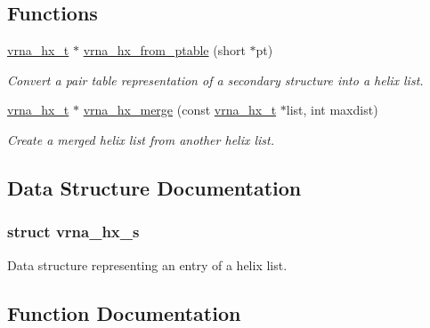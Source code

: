\subsection*{Functions}
\begin{DoxyCompactItemize}
\item 
\mbox{\hyperlink{group__struct__utils__helix__list_ga877363f3a1703b53ecd025c6fcf897a0}{vrna\+\_\+hx\+\_\+t}} $\ast$ \mbox{\hyperlink{group__struct__utils__helix__list_ga7ca60670fbbf23ae2ac9f63e5dbf8aef}{vrna\+\_\+hx\+\_\+from\+\_\+ptable}} (short $\ast$pt)
\begin{DoxyCompactList}\small\item\em Convert a pair table representation of a secondary structure into a helix list. \end{DoxyCompactList}\item 
\mbox{\label{group__struct__utils__helix__list_ga2fdaac8bb6c239c119ad5c20b145b7f2}} 
\mbox{\hyperlink{group__struct__utils__helix__list_ga877363f3a1703b53ecd025c6fcf897a0}{vrna\+\_\+hx\+\_\+t}} $\ast$ \mbox{\hyperlink{group__struct__utils__helix__list_ga2fdaac8bb6c239c119ad5c20b145b7f2}{vrna\+\_\+hx\+\_\+merge}} (const \mbox{\hyperlink{group__struct__utils__helix__list_ga877363f3a1703b53ecd025c6fcf897a0}{vrna\+\_\+hx\+\_\+t}} $\ast$list, int maxdist)
\begin{DoxyCompactList}\small\item\em Create a merged helix list from another helix list. \end{DoxyCompactList}\end{DoxyCompactItemize}


\subsection{Data Structure Documentation}
\label{structvrna__hx__s}
\subsubsection{struct vrna\+\_\+hx\+\_\+s}
Data structure representing an entry of a helix list. 

\subsection{Function Documentation}
\mbox{\label{group__struct__utils__helix__list_ga7ca60670fbbf23ae2ac9f63e5dbf8aef}} 
